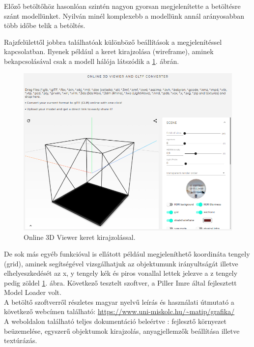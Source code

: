 Előző betöltőhöz hasonlóan szintén nagyon gyorsan megjelenítette a betöltésre szánt modellünket. Nyilván minél komplexebb a modellünk annál arányosabban több időbe telik a betöltés.

\newpage
Rajzfelülettől jobbra találhatóak különböző beállítások a megjelenítéssel kapcsolatban. Ilyenek például a keret kirajzolása (wireframe), aminek bekapcsolásával csak a modell hálója látszódik a \ref{fig:3d3}. ábrán.
\begin{figure}[h]
\bigskip
\centering
\includegraphics[width=\textwidth]{images/3D_creators_4.png}
\caption{Online 3D Viewer keret kirajzolással.}
\label{fig:3d3}
\end{figure}
\bigskip

De sok más egyéb funkcióval is ellátott például megjeleníthető koordináta tengely (grid), aminek segítségével vizsgálhatjuk az objektumunk irányultságát illetve elhelyeszkedését az x, y tengely kék és piros vonallal lettek jelezve a z tengely pedig zöldel  \ref{fig:3d3}. ábra.
\newpage
{}
Következő tesztelt szoftver, a Piller Imre által fejlesztett Model Loader volt.\cite{imre2020model}\\

\noindent A betöltő szoftverről részletes magyar nyelvű leírás és használati útmutató a következő webcímen található: \url{https://www.uni-miskolc.hu/~matip/grafika/}\\

A weboldalon található teljes dokumentáció beleértve : fejlesztő környezet beüzemelése, egyszerű objektumok kirajzolás, anyagjellemzők beállítása illetve textúrázás.

